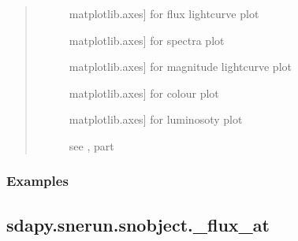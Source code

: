 \documentclass[letterpaper,10pt,english]{sphinxmanual}
\begin{document}
\begin{fulllineitems}
\begin{quote}
\begin{description}
\begin{description}
\item[{}] \leavevmode{[}matplotlib.axes{]}
for flux lightcurve plot

\item[{}] \leavevmode{[}matplotlib.axes{]}
for spectra plot

\item[{}] \leavevmode{[}matplotlib.axes{]}
for magnitude lightcurve plot

\item[{}] \leavevmode{[}matplotlib.axes{]}
for colour plot

\item[{}] \leavevmode{[}matplotlib.axes{]}
for luminosoty plot

\item[{}] \leavevmode{[}\sphinxtitleref{Keyword Arguments}{]}
see ,
 part

\end{description}

\end{description}\end{quote}
\subsubsection*{Examples}

\begin{sphinxVerbatim}[commandchars=\\\{\}]
   
  
\end{sphinxVerbatim}

\end{fulllineitems}



\subsection{sdapy.snerun.snobject.\_flux\_at}
\label{\detokenize{generated/sdapy.snerun.snobject._flux_at:sdapy-snerun-snobject-flux-at}}\label{\detokenize{generated/sdapy.snerun.snobject._flux_at::doc}}
\end{document}
